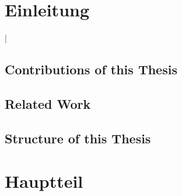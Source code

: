 \documentclass[german,version-2020-11]{uzl-thesis}
\begin{document}
%
%


\chapter{Einleitung}


%

\lstMakeShortInline[style=code,style=inline,language={[LaTeX]tex},moretexcs={chapter}]|



\section{Contributions of this Thesis}



\section{Related Work}


\section{Structure of this Thesis}

\chapter{Hauptteil}
\end{document}
